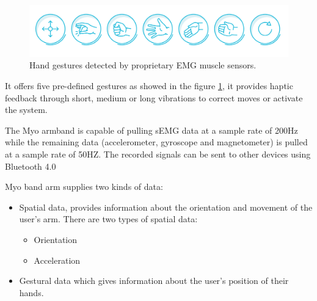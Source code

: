 \begin{figure}[H]                    
	\includegraphics[width=.5\textwidth]{figures/myob/gestures}  %
	\caption{Hand gestures detected by proprietary EMG muscle sensors. \cite{}}
	\label{fig:gestures}  %
\end{figure}
It offers five pre-defined gestures as showed in the figure \ref{fig:gestures}, it provides haptic feedback through short, medium or long vibrations to correct moves or activate the system.

The Myo armband is capable of pulling sEMG data at a sample rate of 200Hz while the remaining data (accelerometer, gyroscope and magnetometer) is pulled at a sample rate of  50HZ. The recorded signals can be sent to other devices using Bluetooth 4.0 

Myo band arm supplies two kinds of data:
\begin{itemize}
\item Spatial data, provides information about the orientation and movement of the user's arm. There are two types of spatial data:
\begin{itemize}
\item Orientation
\item Acceleration
\end{itemize}
\item Gestural data which gives information about the user's position of their hands.

\end{itemize}







